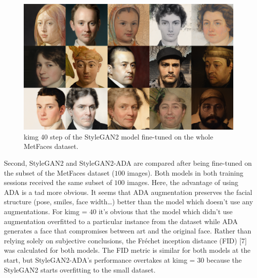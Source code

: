 \documentclass[conference]{IEEEtran}
\begin{document}
\begin{figure}[!h]
	\begin{center}
		\includegraphics[width=1\columnwidth]{./images/picked_images/stylegan2_step_40_full_dataset.png}
		\caption{kimg 40 step of the StyleGAN2 model fine-tuned on the whole MetFaces dataset.}
		\label{fig:figure7}
	\end{center}
\end{figure}

Second, StyleGAN2 and StyleGAN2-ADA are compared after being fine-tuned on the subset of the MetFaces dataset ($100$ images). Both models in both training sessions received the same subset of $100$ images. Here, the advantage of using ADA is a tad more obvious. It seems that ADA augmentation preserves the facial structure (pose, smiles, face width…) better than the model which doesn’t use any augmentations. For kimg = $40$ it’s obvious that the model which didn’t use augmentation overfitted to a particular instance from the dataset while ADA generates a face that compromises between art and the original face. Rather than relying solely on subjective conclusions, the Fréchet inception distance (FID) [7] was calculated for both models. The FID metric is similar for both models at the start, but StyleGAN2-ADA’s performance overtakes at kimg = $30$ because the StyleGAN2 starts overfitting to the small dataset.
\end{document}
